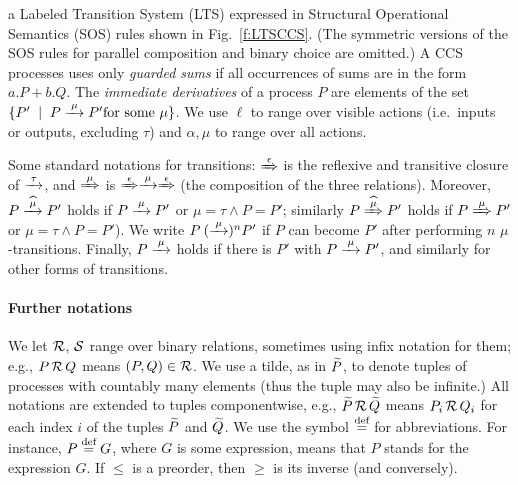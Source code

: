a Labeled Transition System (LTS) expressed in Structural Operational
Semantics (SOS) rules shown in Fig.~\ref{f:LTSCCS}.
(The symmetric versions of the SOS rules for
parallel composition and binary choice are omitted.)
A CCS processes uses only \emph{guarded sums} if all occurrences of
sums are in the form $a.P + b.Q$. 
The \emph{immediate derivatives} of a
process $P$ are elements of the set $\{P' \st P \arr\mu P' \mbox{for some $\mu$}\}$.
We use $\ell$ to range over visible actions (i.e.~inputs or outputs, excluding  $\tau$)
and $\alpha, \mu$  to range over all actions.

Some standard notations for transitions: $\Arr\epsilon$ is the 
reflexive and transitive closure of $\arr\tau$, and 
$\Arr \mu $ is $\Arr\epsilon \arr\mu \Arr\epsilon$ (the
composition of the three relations).
Moreover,   
$P \arcap \mu P'$ holds if $P \arr\mu P'$ or $\mu =\tau \wedge P = P'$; similarly 
$P \Arcap \mu P'$ holds if $P \Arr\mu P'$ or $\mu =\tau \wedge P = P'$).
We write $P \:(\arr\mu)^n P'$ if $P$ can become $P'$ after performing
$n$ $\mu$-transitions. Finally, $P \arr\mu$ holds if there is $P'$
with $P \arr\mu P'$, and similarly for other forms of transitions.

\paragraph{Further notations}
We let $\R$, $\S$ range over binary relations, sometimes using 
 infix notation for them; e.g., 
$P \,\R\, Q$ means $(P,Q) \in \R$.
We use a tilde, as in  $\til P$, to denote tuples of processes with
countably many elements (thus the tuple may also be infinite.)
All notations are extended to tuples componentwise,
e.g., $\til P \,\R\, \til Q$ means $P_i \,\R\, Q_i$ for each  
index $i$ of the tuples $\til P$ and $\til Q$.
We use the symbol $\DSdefi$ for abbreviations. For instance, $P \DSdefi G $, where
$G$ is some expression, means that $P$ stands for the expression $G$.
If $\leq$ is a preorder, then  $\geq$  is its inverse (and
conversely).

